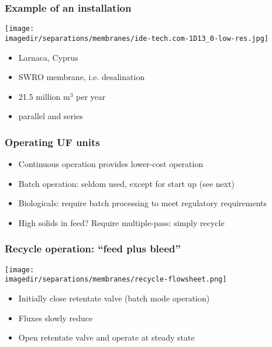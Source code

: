 \begin{frame}\frametitle{Example of an installation}
	\texttt{[image: \\imagedir/separations/membranes/ide-tech.com-1D13\_0-low-res.jpg]}
	\begin{itemize}
		\item	Larnaca, Cyprus
		\item	SWRO membrane, i.e. desalination
		\item	21.5 million $\text{m}^3$ per year
		\item	parallel and series
	\end{itemize}	
\end{frame}

\begin{frame}\frametitle{Operating UF units}
	\begin{itemize}
		\item	Continuous operation provides lower-cost operation
		\item	Batch operation: seldom used, except for start up (see next)
		\item	Biologicals: require batch processing to meet regulatory requirements
		\item	High solids in feed? Require multiple-pass: simply recycle
	\end{itemize}

\end{frame}

\begin{frame}\frametitle{Recycle operation: ``feed plus bleed''}
	\begin{center}
		\texttt{[image: \\imagedir/separations/membranes/recycle-flowsheet.png]}
	\end{center}
	\begin{itemize}
		\item	Initially close retentate valve (batch mode operation)
		\item	Fluxes slowly reduce
		\item	Open retentate valve and operate at steady state
	\end{itemize}
\end{frame}

